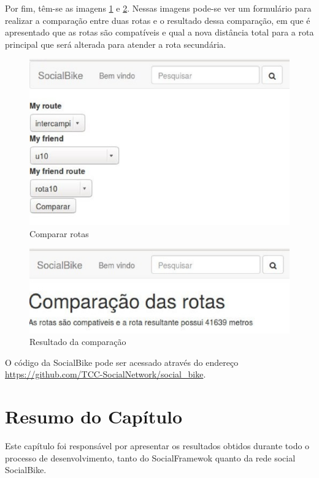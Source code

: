 Por fim, têm-se as imagens \ref{comparar_rotas} e \ref{resultado_comparacao}. Nessas imagens pode-se ver um formulário para realizar a comparação entre duas rotas e o resultado dessa comparação, em que é apresentado que as rotas são compatíveis e qual a nova distância total para a rota principal que será alterada para atender a rota secundária.

\begin{figure}[!h]
	\centering
	\includegraphics[scale=0.5]{figuras/resultados/comparar_rotas.eps}
	\caption[Comparar rotas]{Comparar rotas}
	\label{comparar_rotas}
\end{figure}

\begin{figure}[!h]
	\centering
	\includegraphics[scale=0.5]{figuras/resultados/resultado_comparacao.eps}
	\caption[Resultado da comparação]{Resultado da comparação}
	\label{resultado_comparacao}
\end{figure}

O código da SocialBike pode ser acessado através do endereço \url{https://github.com/TCC-SocialNetwork/social_bike}.

\section{Resumo do Capítulo}
Este capítulo foi responsável por apresentar os resultados obtidos durante todo o processo de desenvolvimento, tanto do SocialFramewok quanto da rede social SocialBike.

